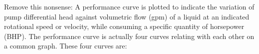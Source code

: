 
Remove this nonsense:
A performance curve is plotted to indicate the variation of pump differential head against volumetric flow (gpm) of a liquid at an indicated rotational speed or velocity, while consuming a specific quantity of horsepower (BHP). The performance curve is actually four curves relating with each other on a common graph. These four curves are:

 